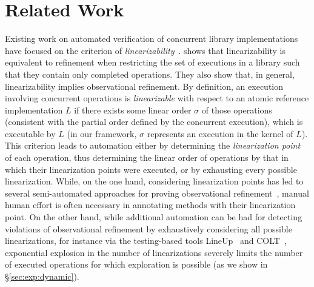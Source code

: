 \section{Related Work}
\label{sec:related}


Existing work on automated verification of concurrent library implementations
have focused on the criterion of
\emph{linearizability}~\citep{journals/toplas/HerlihyW90}. 
\citet{journals/tcs/FilipovicORY10}
shows that linearizability is equivalent to refinement when restricting the set of executions in a library
such that they contain only completed operations. They also show that, in general, linearizability implies
observational refinement. 
By definition, an execution
involving concurrent operations is \emph{linearizable} with respect to an
atomic reference implementation $L$ if there exists some linear order $\sigma$ of
those operations (consistent with the partial order defined by the concurrent execution), 
which is executable by $L$ (in our framework, $\sigma$ represents an execution in
the kernel of $L$). 
This criterion leads to automation
either by determining the \emph{linearization
point}~\citep{journals/toplas/HerlihyW90} of each operation, 
thus determining the linear order of operations by that in which their linearization points were
executed, or by exhausting every possible linearization. While, on the one
hand, considering linearization points has led to several semi-automated
approaches for proving observational refinement~\citep{DBLP:conf/cav/AmitRRSY07,conf/fm/LiuCLS09, conf/podc/OHearnRVYY10,
conf/cav/Vafeiadis10, conf/icse/Zhang11a, conf/pldi/LiangF13,
conf/cav/DragoiGH13}, manual human effort is often necessary in annotating
methods with their linearization point. On the other hand, while additional
automation can be had for detecting violations of observational refinement 
by exhaustively considering all possible linearizations,
for instance via the testing-based tools LineUp~\citep{conf/pldi/BurckhardtDMT10} and 
COLT~\citep{DBLP:conf/oopsla/ShachamBASVY11}, exponential
explosion in the number of linearizations severely limits the number of
executed operations for which exploration is possible (as we show in \S\ref{sec:exp:dynamic}). 

